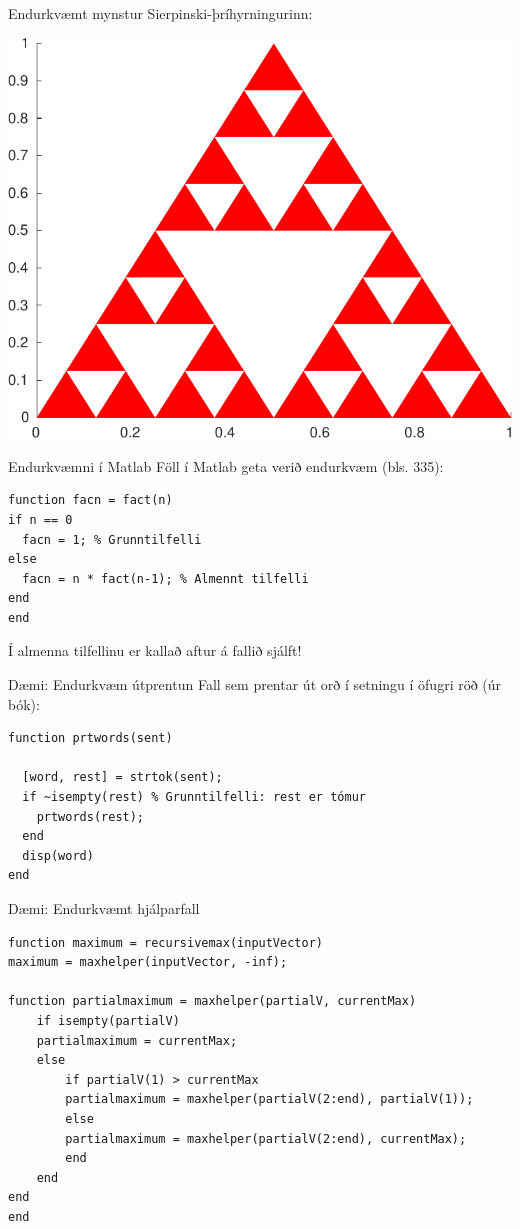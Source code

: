 \documentclass[handout]{beamer}
\begin{document}
\begin{frame}{Endurkvæmt mynstur}
Sierpinski-þríhyrningurinn:
\begin{center}
\includegraphics[width=0.6\linewidth]{Pics/sierpinski}
\end{center}
\end{frame}

\begin{frame}[fragile]{Endurkvæmni í Matlab}
Föll í Matlab geta verið endurkvæm (bls. 335):
\begin{verbatim}
function facn = fact(n)
if n == 0
  facn = 1; % Grunntilfelli
else
  facn = n * fact(n-1); % Almennt tilfelli
end
end
\end{verbatim}
Í almenna tilfellinu er kallað aftur á fallið sjálft!
\end{frame}

\begin{frame}[fragile]{Dæmi: Endurkvæm útprentun}
Fall sem prentar út orð í setningu í öfugri röð (úr bók):
\begin{verbatim}
function prtwords(sent)

  [word, rest] = strtok(sent);
  if ~isempty(rest) % Grunntilfelli: rest er tómur
    prtwords(rest);
  end
  disp(word)
end
\end{verbatim}
\end{frame}

\begin{frame}[fragile]{Dæmi: Endurkvæmt hjálparfall}
\vspace{\baselineskip}
\begin{verbatim}
function maximum = recursivemax(inputVector)
maximum = maxhelper(inputVector, -inf);

function partialmaximum = maxhelper(partialV, currentMax)
	if isempty(partialV)
	partialmaximum = currentMax;
	else
		if partialV(1) > currentMax
		partialmaximum = maxhelper(partialV(2:end), partialV(1));
		else
		partialmaximum = maxhelper(partialV(2:end), currentMax);
		end
	end
end
end
\end{verbatim}
\end{frame}
\end{document}
